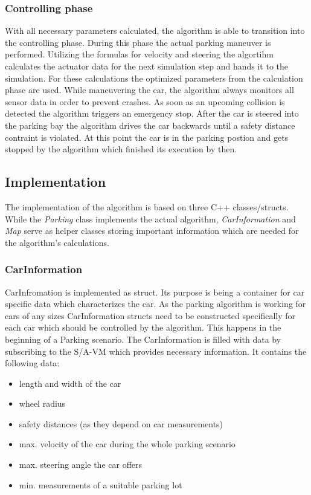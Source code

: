 \documentclass[paper=a4, fontsize=11pt]{scrreprt}
\begin{document}
\subsubsection{Controlling phase}
With all necessary parameters calculated, the algorithm is able to transition into the controlling phase. During this phase the actual parking maneuver is performed. Utilizing the formulas for velocity and steering the algortihm calculates the actuator data for the next simulation step and hands it to the simulation.  For these calculations the optimized parameters from the calculation phase are used. While maneuvering the car, the algorithm always monitors all sensor data in order to prevent crashes. As soon as an upcoming collision is detected the algorithm triggers an emergency stop. After the car is steered into the parking bay the algorithm drives the car backwards until a safety distance contraint is violated. At this point the car is in the parking postion and gets stopped by the algorithm which finished its execution by then.
\subsection{Implementation}
The implementation of the algorithm is based on three C++ classes/structs. While the \textit{Parking} class implements the actual algorithm, \textit{CarInformation} and \textit{Map} serve as helper classes storing important information which are needed for the algorithm's calculations.
\subsubsection{CarInformation}
CarInfromation is implemented as struct. Its purpose is being a container for car specific data which characterizes the car. As the parking algorithm is working for cars of any sizes CarInformation structs need to be constructed specifically for each car which should be controlled by the algorithm. This happens in the beginning of a Parking scenario. The CarInformation is filled with data by subscribing to the S/A-VM which provides necessary information. It contains the following data:
\begin{itemize}
	\item length and width of the car
	\item wheel radius
	\item safety distances (as they depend on car measurements)
	\item max. velocity of the car during the whole parking scenario
	\item max. steering angle the car offers
	\item min. measurements of a suitable parking lot
\end{itemize}
\end{document}
